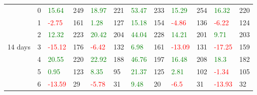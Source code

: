 \begin{table}[!htb]
\begin{adjustwidth}{-0.8in}{-0.9in}
\begin{tabular}{|p{4em}|p{2em}|p{3em}|p{3em}|p{3em}|p{3em}|p{3em}|p{3em}|p{3em}|p{3em}|p{3em}|p{3em}|}
            & 0 & \textcolor{green}{15.64} & 249 & \textcolor{green}{18.97} & 221 & \textcolor{green}{53.47} & 233 & \textcolor{green}{15.29} & 254 & \textcolor{green}{16.32} & 220\\\cline{3-12}
            & 1 & \textcolor{red}{-2.75} & 161 & \textcolor{green}{1.28} & 127 & \textcolor{green}{15.18} & 154 & \textcolor{red}{-4.86} & 136 & \textcolor{red}{-6.22} & 124\\\cline{3-12}
            & 2 & \textcolor{green}{12.32} & 223 & \textcolor{green}{20.42} & 204 & \textcolor{green}{44.04} & 228 & \textcolor{green}{14.21} & 201 & \textcolor{green}{9.71} & 203\\\cline{3-12}
            14 days & 3 & \textcolor{red}{-15.12} & 176 & \textcolor{red}{-6.42} & 132 & \textcolor{green}{6.98} & 161 & \textcolor{red}{-13.09} & 131 & \textcolor{red}{-17.25} & 159\\\cline{3-12}
            & 4 & \textcolor{green}{20.55} & 220 & \textcolor{green}{22.92} & 188 & \textcolor{green}{46.76} & 197 & \textcolor{green}{16.48} & 208 & \textcolor{green}{18.3} & 182\\\cline{3-12}
            & 5 & \textcolor{green}{0.95} & 123 & \textcolor{green}{8.35} & 95 & \textcolor{green}{21.37} & 125 & \textcolor{green}{2.81} & 102 & \textcolor{red}{-1.34} & 105\\\cline{3-12}
            & 6 & \textcolor{red}{-13.59} & 29 & \textcolor{red}{-5.78} & 31 & \textcolor{green}{9.48} & 20 & \textcolor{red}{-6.5} & 31 & \textcolor{red}{-13.93} & 32\\\hline\hline
            

\end{tabular}
\end{adjustwidth}
\end{table}
